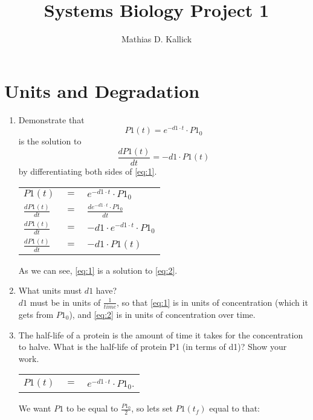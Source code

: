 \documentclass[]{article}
\title{Systems Biology Project 1}
\author{Mathias D. Kallick}
\begin{document}
\maketitle

\section{Units and Degradation}
\begin{enumerate}
	\item Demonstrate that 
	\begin{equation} \label{eq:1}
	P1(t) = e^{-d1 \cdot t} \cdot P1_0
	\end{equation}
	is the solution to
	\begin{equation} \label{eq:2}
	\frac{dP1(t)}{dt} = -d1 \cdot P1(t) 
	\end{equation}
	by differentiating both sides of \ref{eq:1}.
	\begin{center}
	\begin{tabular}{ l c l }
	$P1(t)$ & $=$ & $e^{-d1 \cdot t} \cdot P1_0$ \\
	$\frac{dP1(t)}{dt}$ & $=$ & $\frac{d e^{-d1 \cdot t} \cdot P1_0}{dt}$ \\
	$\frac{dP1(t)}{dt}$ & $=$ & $-d1 \cdot e^{-d1 \cdot t} \cdot P1_0$ \\
	$\frac{dP1(t)}{dt}$ & $=$ & $-d1 \cdot P1(t)$ 
	\end{tabular}
	\end{center}
	As we can see, \ref{eq:1} is a solution to \ref{eq:2}. \\
	\item What units must $d1$ have? \\
		$d1$ must be in units of $\frac{1}{time}$, so that \ref{eq:1} is in units of concentration (which it gets from $P1_0$), and \ref{eq:2} is in units of concentration over time. \\
	\item The half-life of a protein is the amount of time it takes for the concentration to halve. What is the half-life of protein P1 (in terms of d1)? Show your work.
		\begin{center}
		\begin{tabular}{ l c l }
			$P1(t)$ & $=$ & $e^{-d1 \cdot t} \cdot P1_0$. \\
		\end{tabular}
		\end{center}
	We want $P1$ to be equal to $\frac{P1_0}{2}$, so lets set $P1(t_f)$ equal to that:
		\begin{center}

\end{center}
\end{enumerate}
\end{document}
